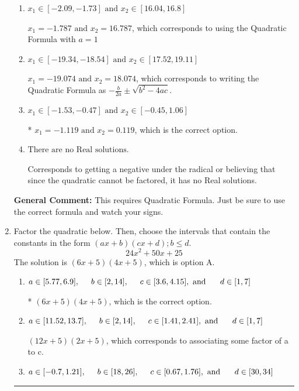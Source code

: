 \documentclass{extbook}[14pt]
\newcommand{\litem}[1]{\item #1

\rule{\textwidth}{0.4pt}}
\begin{document}
\begin{enumerate}
{\begin{enumerate}[label=\Alph*.]
 $x_1 = -0.119 \text{ and } x_2 = 1.119$, which corresponds to writing the Quadratic Formula as $\frac{b \pm \sqrt{b^2 - 4ac}}{2a}$
\item \( x_1 \in [-2.09, -1.73] \text{ and } x_2 \in [16.04, 16.8] \)

 $x_1 = -1.787 \text{ and } x_2 = 16.787$, which corresponds to using the Quadratic Formula with $a=1$
\item \( x_1 \in [-19.34, -18.54] \text{ and } x_2 \in [17.52, 19.11] \)

 $x_1 = -19.074 \text{ and } x_2 = 18.074$, which corresponds to writing the Quadratic Formula as $-\frac{b}{2a} \pm \sqrt{b^2 - 4ac}$.
\item \( x_1 \in [-1.53, -0.47] \text{ and } x_2 \in [-0.45, 1.06] \)

* $x_1 = -1.119 \text{ and } x_2 = 0.119$, which is the correct option.
\item \( \text{There are no Real solutions.} \)

Corresponds to getting a negative under the radical or believing that since the quadratic cannot be factored, it has no Real solutions.
\end{enumerate}

\textbf{General Comment:} This requires Quadratic Formula. Just be sure to use the correct formula and watch your signs.
}
\litem{
Factor the quadratic below. Then, choose the intervals that contain the constants in the form $(ax+b)(cx+d); b \leq d.$
\[ 24x^{2} +50 x + 25 \]
The solution is \( (6x + 5)(4x + 5) \), which is option A.\begin{enumerate}[label=\Alph*.]
\item \( a \in [5.77, 6.9], \hspace*{5mm} b \in [2, 14], \hspace*{5mm} c \in [3.6, 4.15], \text{ and } \hspace*{5mm} d \in [1, 7] \)

* $(6x + 5)(4x + 5)$, which is the correct option.
\item \( a \in [11.52, 13.7], \hspace*{5mm} b \in [2, 14], \hspace*{5mm} c \in [1.41, 2.41], \text{ and } \hspace*{5mm} d \in [1, 7] \)

 $(12x + 5)(2x + 5)$, which corresponds to associating some factor of a to c.
\item \( a \in [-0.7, 1.21], \hspace*{5mm} b \in [18, 26], \hspace*{5mm} c \in [0.67, 1.76], \text{ and } \hspace*{5mm} d \in [30, 34] \)


\end{enumerate}}
\end{enumerate}
\end{document}
